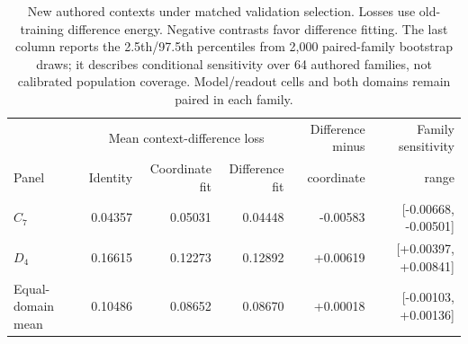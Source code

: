 \begin{table}[t]
\caption{New authored contexts under matched validation selection. Losses use old-training difference energy. Negative contrasts favor difference fitting. The last column reports the 2.5th/97.5th percentiles from 2,000 paired-family bootstrap draws; it describes conditional sensitivity over 64 authored families, not calibrated population coverage. Model/readout cells and both domains remain paired in each family.}
\label{tab:followup-context}
\centering\small\setlength{\tabcolsep}{3pt}
\begin{tabular}{@{}lrrrrr@{}}
\toprule
& \multicolumn{3}{c}{Mean context-difference loss} & Difference minus & Family sensitivity \\
Panel & Identity & Coordinate fit & Difference fit & coordinate & range \\
\midrule
$C_7$ & 0.04357 & 0.05031 & 0.04448 & -0.00583 & [-0.00668, -0.00501] \\
$D_4$ & 0.16615 & 0.12273 & 0.12892 & +0.00619 & [+0.00397, +0.00841] \\
Equal-domain mean & 0.10486 & 0.08652 & 0.08670 & +0.00018 & [-0.00103, +0.00136] \\
\bottomrule
\end{tabular}
\end{table}
